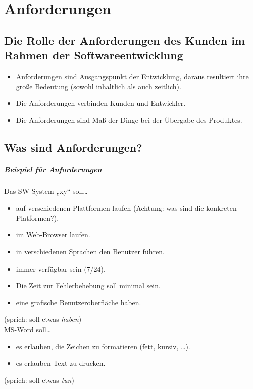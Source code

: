 \documentclass{scrreprt}
\begin{document}
\chapter{Anforderungen}

\section{Die Rolle der Anforderungen des Kunden im Rahmen der Softwareentwicklung}
\begin{itemize}
\item Anforderungen sind Ausgangspunkt der Entwicklung, daraus resultiert ihre große Bedeutung (sowohl inhaltlich als auch zeitlich).
\item Die Anforderungen verbinden Kunden und Entwickler.
\item Die Anforderungen sind Maß der Dinge bei der Übergabe des Produktes.
\end{itemize}

\section{Was sind Anforderungen?}
\paragraph{Beispiel für Anforderungen}
Das SW-System „xy“ soll…
\begin{itemize}
\item auf verschiedenen Plattformen laufen (Achtung: was sind die konkreten Platformen?).
\item im Web-Browser laufen.
\item in verschiedenen Sprachen den Benutzer führen.
\item immer verfügbar sein (7/24).
\item Die Zeit zur Fehlerbehebung soll minimal sein.
\item eine grafische Benutzeroberfläche haben.
\end{itemize}
(sprich: soll etwas \emph{haben})\bigskip\\
MS-Word soll…
\begin{itemize}
\item es erlauben, die Zeichen zu formatieren (fett, kursiv, …).
\item es erlauben Text zu drucken.
\end{itemize}
(sprich: soll etwas \emph{tun})
\end{document}

